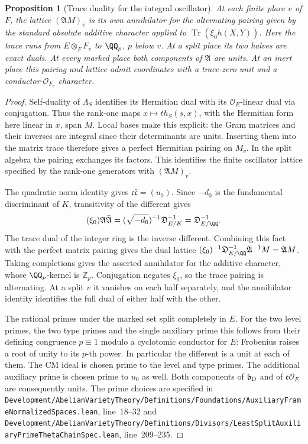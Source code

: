 \documentclass[a4paper,11pt]{article}
\newtheorem{proposition}{Proposition}[section]
\theoremstyle{definition}
\theoremstyle{remark}
\newcommand{\ZZ}{\mathbb Z}\newcommand{\ord}{\operatorname{ord}}
\newcommand{\srcloc}[2]{{\small\nolinkurl{#1.lean}}, line~#2}
\numberwithin{equation}{section}
\begin{document}
\begin{proposition}[Trace duality for the integral oscillator]\leavevmode
\label{prop:tracelat253}
At each finite place \(v\) of \(F\), the lattice
\((\mathfrak A M)_v\) is its own annihilator for the alternating
pairing given by the standard absolute additive character applied
to \(\operatorname{Tr}(\xi_0 h(X,Y))\). Here the trace runs from
\(E\otimes_F F_v\) to \(\QQ_p\), \(p\) below \(v\).
At a split place its two halves are exact duals. At every marked
place both components of \(\mathfrak A\) are units.
At an inert place this pairing and lattice admit coordinates with
a trace-zero unit and a conductor-\(\mathcal O_{F_v}\) character.
\end{proposition}
\begin{proof}
Self-duality of \(\Lambda_S\) identifies its Hermitian dual with
its \(\mathcal O_E\)-linear dual via conjugation. Thus the
rank-one maps \(x\mapsto t h_S(s,x)\), with the Hermitian form
here linear in \(x\), span \(M\). Local bases make this explicit:
the Gram matrices and their inverses are integral since their
determinants are units. Inserting them into the matrix trace
therefore gives a perfect Hermitian pairing on \(M_v\). In the
split algebra the pairing exchanges its factors. This identifies
the finite oscillator lattice specified by the rank-one generators
with \((\mathfrak A M)_v\).

The quadratic norm identity gives \(\mathfrak c\bar{\mathfrak c}
=(u_0)\). Since \(-d_0\) is the fundamental discriminant of
\(K\), transitivity of the different gives
\[
 (\xi_0)\mathfrak A\bar{\mathfrak A}
 =(\sqrt{-d_0})^{-1}\mathfrak D_{E/K}^{-1}
 =\mathfrak D_{E/\QQ}^{-1}.
\]
The trace dual of the integer ring is the inverse different.
Combining this fact with the perfect matrix pairing gives the
dual lattice \((\xi_0)^{-1}\mathfrak D_{E/\QQ}^{-1}
\bar{\mathfrak A}^{-1}M=\mathfrak A M\). Taking completions
gives the asserted annihilator for the additive character, whose
\(\QQ_p\)-kernel is \(\ZZ_p\). Conjugation negates \(\xi_0\),
so the trace pairing is alternating. At a split \(v\) it vanishes
on each half separately, and the annihilator identity identifies
the full dual of either half with the other.

The rational primes under the marked set split completely in
\(E\). For the two level primes, the two type primes and the
single auxiliary prime this follows from their defining
congruence \(p\equiv1\) modulo a cyclotomic conductor for \(E\):
Frobenius raises a root of unity to its \(p\)-th power.
In particular the different is a unit at each of them. The CM
ideal is chosen prime to the level and type primes. The
additional auxiliary prime is chosen prime to \(u_0\) as well.
Both components of \(\mathfrak b_{\rm D}\) and of
\(\mathfrak c\mathcal O_E\) are consequently units. The prime
choices are specified in
\srcloc{Development/AbelianVarietyTheory/Definitions/Foundations/AuxiliaryFrameNormalizedSpaces}{18--32}
and \srcloc{Development/AbelianVarietyTheory/Definitions/Divisors/LeastSplitAuxiliaryPrimeThetaChainSpec}{209--235}.


\end{proof}
\end{document}
